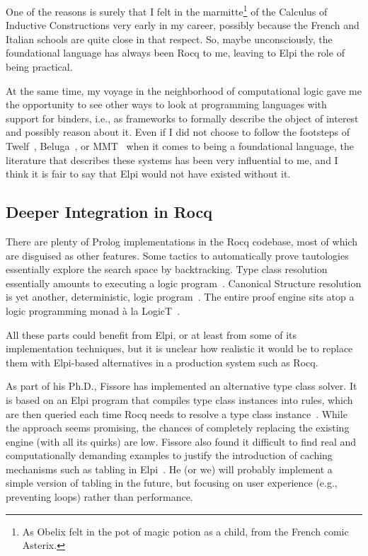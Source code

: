 \documentclass{these-ISSS}
\begin{document}
One of the reasons is surely that I felt in the marmitte\footnote{As Obelix felt
in the pot of magic potion as a child, from the French comic Asterix.}
of the Calculus of
Inductive Constructions very early in my career, possibly because the French
and Italian schools are quite close in that respect. So, maybe unconsciously,
the foundational language has always been Rocq to me, leaving to Elpi the role of
being practical.

At the same time, my voyage in the neighborhood of computational logic gave me
the opportunity to see other ways to look at programming languages with
support for binders, i.e., as frameworks to formally describe the object of
interest and possibly reason about it. Even if I did not choose to follow the
footsteps of Twelf~\cite{twelf}, Beluga~\cite{DBLP:conf/cade/PientkaC15,10.1007/978-3-642-12251-4_1},
or MMT~\cite{RABE20131} when it comes to being a foundational language, the literature
that describes these systems has been very influential to me, and I think it is
fair to say that Elpi would not have existed without it.

\subsection{Deeper Integration in Rocq}

There are plenty of Prolog implementations in the Rocq codebase, most of which
are disguised as other features. Some tactics to automatically prove
tautologies essentially explore the search space by backtracking. Type class
resolution essentially amounts to executing a logic program~\cite{fctc}.
Canonical Structure resolution is yet another, deterministic, logic
program~\cite{tassi13}. The entire proof engine sits atop a logic programming
monad à la LogicT~\cite{logicT}.

All these parts could benefit from Elpi, or at least from some of its
implementation techniques, but it is unclear how realistic it would be to
replace them with Elpi-based alternatives in a production system such as Rocq.

As part of his Ph.D., Fissore has implemented an alternative type class solver.
It is based on an Elpi program that compiles type class instances into rules,
which are then queried each time Rocq needs to resolve a type class
instance~\cite{newtc,unifforfree}. While the approach seems promising, the
chances of completely replacing the existing engine (with all its quirks) are low.
Fissore also found it difficult to find real and computationally demanding
examples to justify the introduction of caching mechanisms such as tabling in
Elpi~\cite{selsam2020tabledtypeclassresolution,brigittePHD}. He (or we) will
probably implement a simple version of tabling in the future, but focusing on
user experience (e.g., preventing loops) rather than performance.
\end{document}
